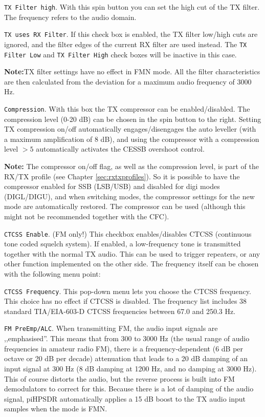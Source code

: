\documentclass[12pt]{book}
\def\rett#1{\texttt{\color{red}#1}}
\def\pH{pi\-HPSDR\xspace}
\begin{document}
\rett{TX Filter high}. With this spin button you can set the high cut of the TX filter. The
frequency refers to the audio domain.

\rett{TX uses RX Filter}. If this check box is enabled, the TX filter low/high cuts are ignored,
and the filter edges of the current RX filter are used instead. The \rett{TX Filter Low}
and \rett{TX Filter High} check boxes will be inactive in this case.

\textbf{Note:}TX filter settings have no effect in FMN mode.
All the filter characteristics are then calculated from the deviation for
a maximum audio frequency of 3000 Hz.

\rett{Compression}. With this box the TX compressor can be enabled/disabled.
The compression level (0-20 dB) can be chosen in the spin button to the right.
Setting TX compression on/off automatically engages/disengages the auto leveller
(with a maximum amplification of 8 dB), and using the compressor with a compression
level $> 5$  automatically activates the CESSB overshoot control.

\textbf{Note:} The compressor on/off flag, as well as the compression level, is
part of the RX/TX profile (see Chapter \ref{sec:rxtxprofiles}).
 So it is possible to have the compressor enabled for SSB
(LSB/USB)
and disabled for digi modes (DIGL/DIGU), and when switching modes, the compressor
settings for the new mode are automatically restored. The compressor can be used (although
this might not be recommended together with the CFC).

\rett{CTCSS Enable}. (FM only!) This checkbox enables/disables CTCSS (continuous tone coded squelch system).
If enabled, a low-frequency
tone is transmitted together with the normal TX audio. This can be used to trigger repeaters, or any other
function implemented
on the other side. The frequency itself can be chosen with the following menu point:

\rett{CTCSS Frequency}. This pop-down menu lets you choose the CTCSS frequency. This choice has no effect if
CTCSS is disabled.
The frequency list includes 38 standard TIA/EIA-603-D CTCSS frequencies between 67.0 and 250.3 Hz.

\rett{FM PreEmp/ALC}. When transmitting FM, the audio input signals are ,,emphasised''.
This means that from 300 to 3000 Hz (the usual range of audio frequencies in amateur
radio FM), there is a frequency-dependent (6 dB per octave  or 20 dB per decade)
attenuation that leads to a 20 dB damping
of an input signal at 300 Hz (8 dB damping at 1200 Hz, and no damping at 3000 Hz).
This of course distorts the audio, but the reverse process is built into FM demodulators
to correct for this. Because there is a lot of damping of the audio signal, \pH
automatically applies a 15 dB boost to the TX audio input samples when the mode is FMN.
\end{document}
